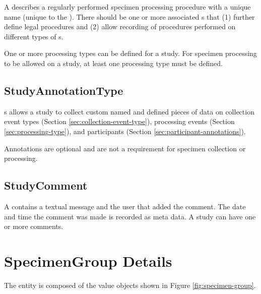 A  describes a regularly performed specimen
processing procedure with a unique name (unique to the
). There should be one or more associated
s that (1) further define legal procedures and (2)
allow recording of procedures performed on different types of
s.

One or more processing types can be defined for a study. For specimen
processing to be allowed on a study, at least one processing type must be
defined.

\subsection*{StudyAnnotationType}

s allows a study to collect custom named and
defined pieces of data on collection event types (Section
\ref{sec:collection-event-type}), processing events (Section
\ref{sec:processing-type}), and participants (Section
\ref{sec:participant-annotations}).

Annotations are optional and are not a requirement for specimen collection or
processing.

\subsection*{StudyComment}

A  contains a textual message and the user that
added the comment. The date and time the comment was made is recorded as meta
data. A study can have one or more comments.

\section{SpecimenGroup Details}
\label{sec:specimen-group}

The  entity is composed of the value objects shown
in Figure \ref{fig:specimen-group}.

